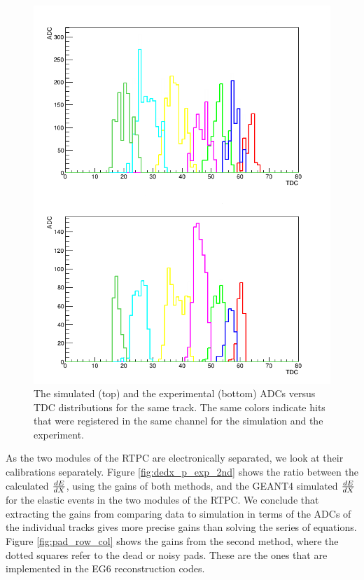 \begin{figure}[tp]
\centering
\vspace{-0.1in}
\includegraphics[scale=0.350]{fig_rtpc/EVENT_adc_tdc.png}
\caption{The simulated (top) and the experimental (bottom) ADCs versus TDC distributions for the same track. The same colors indicate hits that were registered in the same channel for the simulation and the experiment.}
\label{fig:EVENT_adc_tdc}
\end{figure}

As the two modules of the RTPC are electronically separated, we look at their calibrations separately. Figure \ref{fig:dedx_p_exp_2nd} shows the ratio between the calculated $\small{\frac{dE}{dX}}$, using the gains of both methods, and the GEANT4 simulated $\small{\frac{dE}{dX}}$ for the elastic events in the two modules of the RTPC. We conclude that extracting the gains from comparing data to simulation in terms of the ADCs of the individual tracks gives more precise gains than solving the series of equations. Figure \ref{fig:pad_row_col} shows the gains from the second method, where the dotted squares refer to the dead or noisy pads. These are the ones that are implemented in the EG6 reconstruction codes.\\

